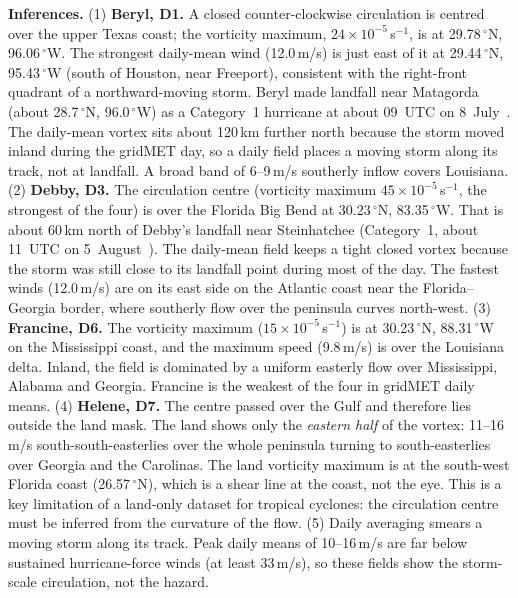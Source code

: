 \textbf{Inferences.}
(1) \textbf{Beryl, D1.} A closed counter-clockwise circulation is centred over the upper Texas coast; the vorticity
maximum, $24\times10^{-5}$\,s$^{-1}$, is at 29.78\,$^\circ$N, 96.06\,$^\circ$W. The strongest daily-mean wind (12.0\,m/s) is
just east of it at 29.44\,$^\circ$N, 95.43\,$^\circ$W (south of Houston, near Freeport), consistent with the right-front quadrant of a
northward-moving storm. Beryl made landfall near Matagorda (about 28.7\,$^\circ$N, 96.0\,$^\circ$W) as a Category~1
hurricane at about 09~UTC on 8~July~\cite{nhc_tcr}. The daily-mean vortex sits about 120\,km further north because the
storm moved inland during the gridMET day, so a daily field places a moving storm along its track, not at landfall.
A broad band of 6--9\,m/s southerly inflow covers Louisiana.
(2) \textbf{Debby, D3.} The circulation centre (vorticity maximum $45\times10^{-5}$\,s$^{-1}$, the strongest of the four) is
over the Florida Big Bend at 30.23\,$^\circ$N, 83.35\,$^\circ$W. That is about 60\,km north of Debby's landfall near Steinhatchee
(Category~1, about 11~UTC on 5~August~\cite{nhc_tcr}). The daily-mean field keeps a tight closed vortex because the storm
was still close to its landfall point during most of the day. The fastest winds (12.0\,m/s) are on its east side on the Atlantic coast near the Florida--Georgia border, where southerly flow over
the peninsula curves north-west.
(3) \textbf{Francine, D6.} The vorticity maximum ($15\times10^{-5}$\,s$^{-1}$) is at 30.23\,$^\circ$N, 88.31\,$^\circ$W on the
Mississippi coast, and the maximum speed (9.8\,m/s) is over the Louisiana delta. Inland, the field is dominated by a uniform
easterly flow over Mississippi, Alabama and Georgia. Francine is the weakest of the four in gridMET daily means.
(4) \textbf{Helene, D7.} The centre passed over the Gulf and therefore lies outside the land mask. The land shows only the
\emph{eastern half} of the vortex: 11--16\,m/s south-south-easterlies over the whole peninsula turning to south-easterlies
over Georgia and the Carolinas. The land vorticity maximum is at the south-west Florida coast (26.57\,$^\circ$N), which is a
shear line at the coast, not the eye. This is a key limitation of a land-only dataset for tropical cyclones: the
circulation centre must be inferred from the curvature of the flow.
(5) Daily averaging smears a moving storm along its track. Peak daily means of 10--16\,m/s are far below sustained
hurricane-force winds (at least 33\,m/s), so these fields show the storm-scale circulation, not the hazard.

